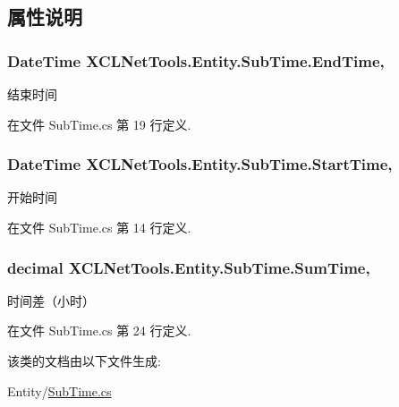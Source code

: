 \subsection{属性说明}
\hypertarget{class_x_c_l_net_tools_1_1_entity_1_1_sub_time_a286d907d4beb9e6153f1abdb6f2c95fd}{
\subsubsection[{End\-Time}]{\setlength{\rightskip}{0pt plus 5cm}Date\-Time X\-C\-L\-Net\-Tools.\-Entity.\-Sub\-Time.\-End\-Time\hspace{0.3cm}{\ttfamily [get]}, {\ttfamily [set]}}}\label{class_x_c_l_net_tools_1_1_entity_1_1_sub_time_a286d907d4beb9e6153f1abdb6f2c95fd}


结束时间 



在文件 Sub\-Time.\-cs 第 19 行定义.

\hypertarget{class_x_c_l_net_tools_1_1_entity_1_1_sub_time_a7813c7a0874535abbe0b5307d7310c27}{
\subsubsection[{Start\-Time}]{\setlength{\rightskip}{0pt plus 5cm}Date\-Time X\-C\-L\-Net\-Tools.\-Entity.\-Sub\-Time.\-Start\-Time\hspace{0.3cm}{\ttfamily [get]}, {\ttfamily [set]}}}\label{class_x_c_l_net_tools_1_1_entity_1_1_sub_time_a7813c7a0874535abbe0b5307d7310c27}


开始时间 



在文件 Sub\-Time.\-cs 第 14 行定义.

\hypertarget{class_x_c_l_net_tools_1_1_entity_1_1_sub_time_afe5aa74e0038c4b4342be84211c3f607}{
\subsubsection[{Sum\-Time}]{\setlength{\rightskip}{0pt plus 5cm}decimal X\-C\-L\-Net\-Tools.\-Entity.\-Sub\-Time.\-Sum\-Time\hspace{0.3cm}{\ttfamily [get]}, {\ttfamily [set]}}}\label{class_x_c_l_net_tools_1_1_entity_1_1_sub_time_afe5aa74e0038c4b4342be84211c3f607}


时间差（小时） 



在文件 Sub\-Time.\-cs 第 24 行定义.



该类的文档由以下文件生成\-:\begin{DoxyCompactItemize}
\item 
Entity/\hyperlink{_sub_time_8cs}{Sub\-Time.\-cs}\end{DoxyCompactItemize}
